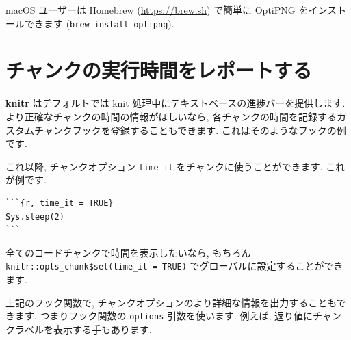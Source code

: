\documentclass[
  11pt,
]{bxjsreport}
\newenvironment{Shaded}{\begin{snugshade}}{\end{snugshade}}
\newcommand{\AttributeTok}[1]{\textcolor[rgb]{0.77,0.63,0.00}{#1}}
\newcommand{\CommentTok}[1]{\textcolor[rgb]{0.56,0.35,0.01}{\textit{#1}}}
\newcommand{\ConstantTok}[1]{\textcolor[rgb]{0.00,0.00,0.00}{#1}}
\newcommand{\ControlFlowTok}[1]{\textcolor[rgb]{0.13,0.29,0.53}{\textbf{#1}}}
\newcommand{\FunctionTok}[1]{\textcolor[rgb]{0.00,0.00,0.00}{#1}}
\newcommand{\NormalTok}[1]{#1}
\newcommand{\OtherTok}[1]{\textcolor[rgb]{0.56,0.35,0.01}{#1}}
\newcommand{\SpecialCharTok}[1]{\textcolor[rgb]{0.00,0.00,0.00}{#1}}
\newcommand{\StringTok}[1]{\textcolor[rgb]{0.31,0.60,0.02}{#1}}
\begin{document}
macOS ユーザーは Homebrew (\url{https://brew.sh}) で簡単に OptiPNG をインストールできます (\texttt{brew install optipng}).

\hypertarget{time-chunk}{%
\section{チャンクの実行時間をレポートする}\label{time-chunk}}

\textbf{knitr} はデフォルトでは knit 処理中にテキストベースの進捗バーを提供します. より正確なチャンクの時間の情報がほしいなら, 各チャンクの時間を記録するカスタムチャンクフックを登録することもできます. これはそのようなフックの例です.

\begin{Shaded}
\end{Shaded}

これ以降, チャンクオプション \texttt{time\_it} をチャンクに使うことができます. これが例です.

\begin{verbatim}
```{r, time_it = TRUE}
Sys.sleep(2)
```
\end{verbatim}

全てのコードチャンクで時間を表示したいなら, もちろん \texttt{knitr::opts\_chunk\$set(time\_it = TRUE)} でグローバルに設定することができます.

上記のフック関数で, チャンクオプションのより詳細な情報を出力することもできます. つまりフック関数の \texttt{options} 引数を使います. 例えば, 返り値にチャンクラベルを表示する手もあります.
\end{document}
